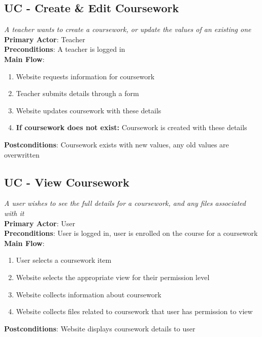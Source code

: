 \documentclass[a4paper,11pt]{report}
\begin{document}
\subsection*{UC - Create \& Edit Coursework}
\textit{A teacher wants to create a coursework, or update the values of an existing one}\\
\textbf{Primary Actor}: Teacher\\
\textbf{Preconditions}: A teacher is logged in\\
\textbf{Main Flow}:
\begin{enumerate}
\item Website requests information for coursework
\item Teacher submits details through a form
\item Website updates coursework with these details
\item \textbf{If coursework does not exist:} Coursework is created with these details
\end{enumerate}
\textbf{Postconditions}: Coursework exists with new values, any old values are overwritten

\subsection*{UC - View Coursework}
\textit{A user wishes to see the full details for a coursework, and any files associated with it}\\
\textbf{Primary Actor}: User\\
\textbf{Preconditions}: User is logged in, user is enrolled on the course for a coursework\\
\textbf{Main Flow}:
\begin{enumerate}
\item User selects a coursework item
\item Website selects the appropriate view for their permission level
\item Website collects information about coursework
\item Website collects files related to coursework that user has permission to view
\end{enumerate}
\textbf{Postconditions}: Website displays coursework details to user
\end{document}
